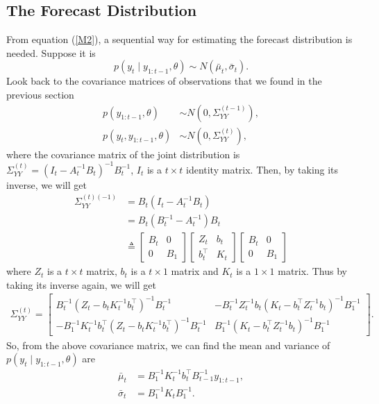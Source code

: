 \subsection{The Forecast Distribution}\label{sectionforecast}

From equation (\ref{M2}), a sequential way for estimating the forecast distribution is needed. Suppose it is 
\begin{equation}
p(y_{t}\mid y_{1:t-1},\theta) \sim N\left( \bar{\mu}_{t},\bar{\sigma}_{t} \right). 
\end{equation}
Look back to the covariance matrices of observations that we found in the previous section 
\begin{align*}
p(y_{1:t-1},\theta) &\sim N\left( 0,\Sigma_{YY}^{(t-1)} \right),\\
p(y_{t},y_{1:t-1},\theta) &\sim N\left( 0,\Sigma_{YY}^{(t)} \right),
\end{align*}
where the covariance matrix of the joint distribution is $\Sigma_{YY}^{(t)} = (I_{t}-A_{t}^{-1}B_{t})^{-1}B_{t}^{-1}$, $I_t$ is a $t\times t$ identity matrix. Then, by taking its inverse, we will get 
\begin{align*}
\Sigma_{YY}^{(t) (-1)} &= B_{t}(I_{t}-A_{t}^{-1}B_{t}) \\
&= B_{t}(B_{t}^{-1}-A_{t}^{-1})B_{t} \\
&\triangleq \begin{bmatrix} 
B_t & 0 \\ 0 & B_1 \end{bmatrix}
\begin{bmatrix} 
Z_{t} & b_{t} \\
b_{t}^\top & K_{t}
\end{bmatrix} \begin{bmatrix} 
B_t & 0 \\ 0 & B_1\end{bmatrix}
\end{align*}
where $Z_{t}$ is a $t \times t$ matrix, $ b_{t} $ is a $t \times 1$ matrix and $K_{t}$ is a $1 \times 1$ matrix. Thus by taking its inverse again, we will get 
\begin{align*} \Sigma_{YY}^{(t)}= \left[ \begin{matrix}
B_t^{-1} (Z_{t}-b_{t}K_{t}^{-1}b_{t}^\top)^{-1}B_t^{-1}  & - B_t^{-1}  Z_{t}^{-1}b_{t}(K_{t}-b_{t}^\top Z_{t}^{-1}b_{t})^{-1}B_1^{-1} \\
-B_1^{-1}  K_{t}^{-1}b_{t}^\top (Z_{t}-b_{t}K_{t}^{-1}b_{t}^\top)^{-1}B_t^{-1}  & B_1^{-1}  (K_{t}-b_{t}^\top Z_{t}^{-1}b_{t})^{-1}B_1^{-1} 
\end{matrix}\right].
\end{align*}
So, from the above covariance matrix, we can find the mean and variance of $p(y_{t}\mid y_{1:t-1},\theta)$ are 
\begin{align}
\bar{\mu}_{t} & =  B_1^{-1}K_{t}^{-1}b_{t}^\top B_{t-1}^{-1}y_{1:t-1} ,\\
\bar{\sigma}_{t} & =  B_1^{-1}K_{t}B_1^{-1}  .
\end{align}





